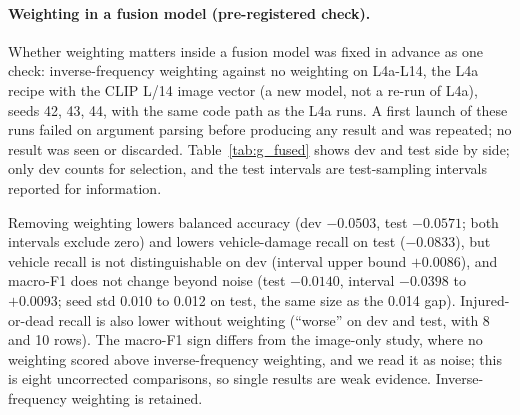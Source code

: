 \paragraph{Weighting in a fusion model (pre-registered check).}
Whether weighting matters inside a fusion model was fixed in advance as one check: inverse-frequency weighting against no weighting on L4a-L14, the L4a recipe with the CLIP L/14 image vector (a new model, not a re-run of L4a), seeds 42, 43, 44, with the same code path as the L4a runs.
A first launch of these runs failed on argument parsing before producing any result and was repeated; no result was seen or discarded.
Table~\ref{tab:g_fused} shows dev and test side by side; only dev counts for selection, and the test intervals are test-sampling intervals reported for information.
\begin{table}[t]
\centering
\small
\setlength{\tabcolsep}{3pt}
\caption{Pre-registered check on L4a-L14 (the L4a recipe with CLIP L/14 features, not a re-run of L4a), seeds 42, 43, 44: inverse-frequency weighting (inv) against no weighting (none), mean $\pm$ seed std. The difference is none minus inv with its paired 95\% interval: dev (the only version used for selection) and test (reporting only, test-sampling interval). Injured or dead has 8 dev and 10 test rows, vehicle damage 38 dev and 36 test rows.}
\label{tab:g_fused}
\end{table}
Removing weighting lowers balanced accuracy (dev $-0.0503$, test $-0.0571$; both intervals exclude zero) and lowers vehicle-damage recall on test ($-0.0833$), but vehicle recall is not distinguishable on dev (interval upper bound $+0.0086$), and macro-F1 does not change beyond noise (test $-0.0140$, interval $-0.0398$ to $+0.0093$; seed std 0.010 to 0.012 on test, the same size as the 0.014 gap).
Injured-or-dead recall is also lower without weighting (``worse'' on dev and test, with 8 and 10 rows).
The macro-F1 sign differs from the image-only study, where no weighting scored above inverse-frequency weighting, and we read it as noise; this is eight uncorrected comparisons, so single results are weak evidence.
Inverse-frequency weighting is retained.
